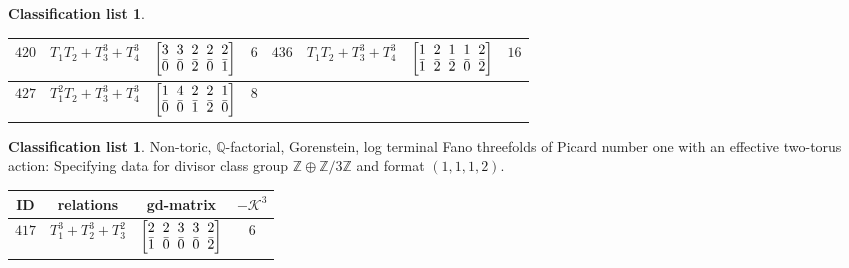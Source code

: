 \documentclass[10pt,a4paper]{amsart}
\theoremstyle{definition}
\newtheorem{class-list}[thm]{Classification list}
\def\ZZ{{\mathbb Z}}
\def\QQ{{\mathbb Q}}
\numberwithin{equation}{section}
\begin{document}
\begin{class-list}
\begin{table}[h!]
\begin{tabu}{c|c|c|c||c|c|c|c}
\hline
${420}$&${T_{1}T_{2}+T_{3}^{3}+T_{4}^{3}}$
&$\arraycolsep=1mm\begin{bmatrix}{3} & {3} & {2} & {2} & {2} \\ {\bar{0}} & {\bar{0}} & {\bar{2}} & {\bar{0}} & {\bar{1}}\end{bmatrix}$&${6}$
&${436}$&${T_{1}T_{2}+T_{3}^{3}+T_{4}^{3}}$
&$\arraycolsep=1mm\begin{bmatrix}{1} & {2} & {1} & {1} & {2} \\ {\bar{1}} & {\bar{2}} & {\bar{2}} & {\bar{0}} & {\bar{2}}\end{bmatrix}$&${16}$
\\
\hline
${427}$&${T_{1}^{2}T_{2}+T_{3}^{3}+T_{4}^{3}}$
&$\arraycolsep=1mm\begin{bmatrix}{1} & {4} & {2} & {2} & {1} \\ {\bar{0}} & {\bar{0}} & {\bar{1}} & {\bar{2}} & {\bar{0}}\end{bmatrix}$&${8}$
\\
\end{tabu}\vspace{2mm}
\end{table}
\end{class-list}

\begin{class-list}
Non-toric, $\QQ$-factorial, Gorenstein, log terminal Fano
threefolds of Picard number one with an effective two-torus action:
Specifying data for divisor class group $\ZZ\oplus \ZZ/3\ZZ$ and
format $(1,1,1,2)$.
\begin{table}[h!]\centering\setlength{\tabcolsep}{5.5pt}
\renewcommand{\arraystretch}{1.35}\small\tabulinesep=1mm
\begin{tabu}{c|c|c|c}
\hline
ID&relations&gd-matrix&$-\mathcal{K}^3$
\\
\hline
${417}$&${T_{1}^{3}+T_{2}^{3}+T_{3}^{2}}$
&$\arraycolsep=1mm\begin{bmatrix}{2} & {2} & {3} & {3} & {2} \\ {\bar{1}} & {\bar{0}} & {\bar{0}} & {\bar{0}} & {\bar{2}}\end{bmatrix}$&${6}$
\\
\hline
\end{tabu}\vspace{4mm}
\end{table}
\end{class-list}
\end{document}
